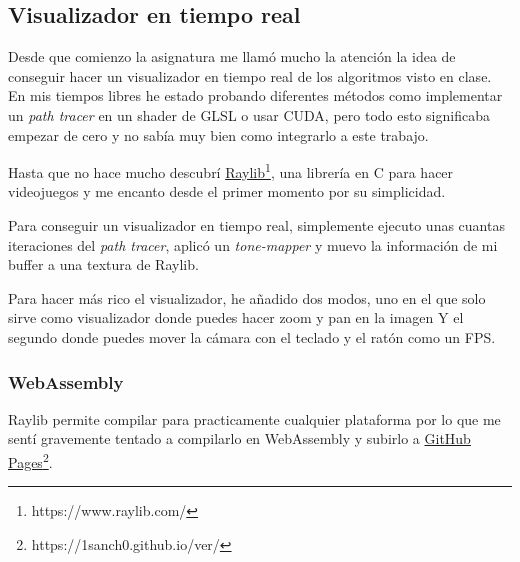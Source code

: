 \documentclass{article}
\begin{document}
\subsection{Visualizador en tiempo real}
Desde que comienzo la asignatura me llamó mucho la atención la idea de conseguir
hacer un visualizador en tiempo real de los algoritmos visto en clase. En mis
tiempos libres he estado probando diferentes métodos como implementar un
\textit{path tracer} en un shader de GLSL o usar CUDA, pero todo esto
significaba empezar de cero y no sabía muy bien como integrarlo a este trabajo.

Hasta que no hace mucho descubrí
\href{https://www.raylib.com/}{Raylib}\footnote{https://www.raylib.com/}, una
librería en C para hacer videojuegos y me encanto desde el primer momento por su
simplicidad.

Para conseguir un visualizador en tiempo real, simplemente ejecuto unas cuantas
iteraciones del \textit{path tracer}, aplicó un \textit{tone-mapper} y muevo la
información de mi buffer a una textura de Raylib.

Para hacer más rico el visualizador, he añadido dos modos, uno en el que solo
sirve como visualizador donde puedes hacer zoom y pan en la imagen Y el segundo
donde puedes mover la cámara con el teclado y el ratón como un FPS.

\subsubsection{WebAssembly}
Raylib permite compilar para practicamente cualquier plataforma por lo que me
sentí gravemente tentado a compilarlo en WebAssembly y subirlo a
\href{https://1sanch0.github.io/ver/}{GitHub
  Pages}\footnote{https://1sanch0.github.io/ver/}.
\end{document}
